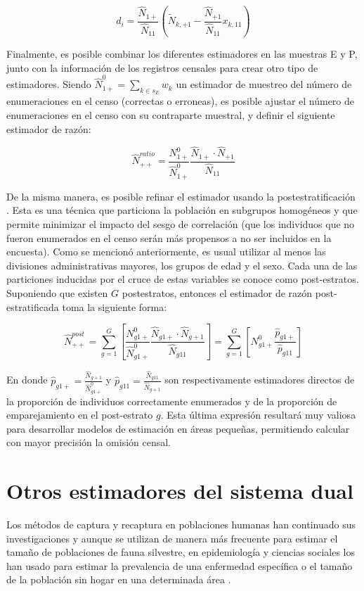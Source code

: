 \documentclass[
  12pt,
]{book}
\begin{document}
\[
d_i = \frac{\hat{N}_{1+}}{\hat{N}_{11}} 
\left(\tilde{N}_{k, +1} - \frac{\hat{N}_{+1}}{\hat{N}_{11}}x_{k, 11}\right)  
\]

Finalmente, es posible combinar los diferentes estimadores en las muestras E y P, junto con la información de los registros censales para crear otro tipo de estimadores. Siendo \(\hat{N}_{1+}^0 = \sum_{k \in s_E}w_k\) un estimador de muestreo del número de enumeraciones en el censo (correctas o erroneas), es posible ajustar el número de enumeraciones en el censo con su contraparte muestral, y definir el siguiente estimador de razón:

\[
\hat{N}_{++}^{ratio} = \frac{N_{1+}^0}{\hat{N}_{1+}^0} \frac{\hat{N}_{1+} \cdot \hat{N}_{+1}}{\hat{N}_{11}}
\]

De la misma manera, es posible refinar el estimador usando la postestratificación \citep{Gutierrez_2016}. Esta es una técnica que particiona la población en subgrupos homogéneos y que permite minimizar el impacto del sesgo de correlación (que los individuos que no fueron enumerados en el censo serán más propensos a no ser incluidos en la encuesta). Como se mencionó anteriormente, es usual utilizar al menos las divisiones administrativas mayores, los grupos de edad y el sexo. Cada una de las particiones inducidas por el cruce de estas variables se conoce como post-estratos. Suponiendo que existen \(G\) postestratos, entonces el estimador de razón post-estratificada toma la siguiente forma:

\[
\hat{N}_{++}^{post} = \sum_{g=1}^G \left[ \frac{N_{g1+}^0}{\hat{N}_{g1+}^0} \frac{\hat{N}_{g1+} \cdot \hat{N}_{g+1}}{\hat{N}_{g11}} \right] =
\sum_{g=1}^G \left[N_{g1+}^0 \frac{\hat{p}_{g1+}}{\hat{p}_{g11}}  \right]
\]

En donde \(\hat{p}_{g1+} = \frac{\hat{N}_{g+1}}{\hat{N}_{g1+}^0}\) y \(\hat{p}_{g11} = \frac{\hat{N}_{g11}}{\hat{N}_{g+1}}\) son respectivamente estimadores directos de la proporción de individuos correctamente enumerados y de la proporción de emparejamiento en el post-estrato \(g\). Esta última expresión resultará muy valiosa para desarrollar modelos de estimación en áreas pequeñas, permitiendo calcular con mayor precisión la omisión censal.

\section{Otros estimadores del sistema dual}\label{otros-estimadores-del-sistema-dual}

Los métodos de captura y recaptura en poblaciones humanas han continuado sus investigaciones y aunque se utilizan de manera más frecuente para estimar el tamaño de poblaciones de fauna silvestre, en epidemiología y ciencias sociales los han usado para estimar la prevalencia de una enfermedad específica o el tamaño de la población sin hogar en una determinada área \citep{brittain2009estimators}.
\end{document}
